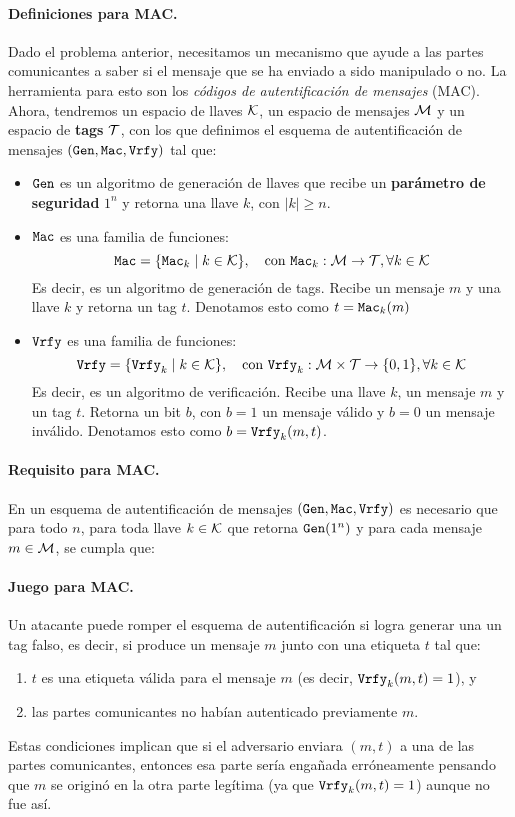 \paragraph{Definiciones para MAC.} Dado el problema anterior, necesitamos un mecanismo que ayude a las partes comunicantes a saber si el mensaje que se ha enviado a sido manipulado o no. La herramienta para esto son los \textit{códigos de autentificación de mensajes} (MAC). Ahora, tendremos un espacio de llaves $\mathcal{K}$, un espacio de mensajes $\mathcal{M}$ y un espacio de \textbf{tags} $\mathcal{T}$, con los que definimos el esquema de autentificación de mensajes $(\texttt{Gen}, \texttt{Mac}, \texttt{Vrfy})$ tal que:

\begin{itemize}
    \item $\texttt{Gen}$ es un algoritmo de generación de llaves que recibe un \textbf{parámetro de seguridad} $1^n$ y retorna una llave $k$, con $|k| \geq n$.
    \item $\texttt{Mac}$ es una familia de funciones:
    $$
    \texttt{Mac} = \{\texttt{Mac}_k \mid k \in \mathcal{K}\}, \quad \text{con } \texttt{Mac}_k:\mathcal{M} \to \mathcal{T}, \forall k \in \mathcal{K}
    $$
    Es decir, es un algoritmo de generación de tags. Recibe un mensaje $m$ y una llave $k$ y retorna un tag $t$. Denotamos esto como $t = \texttt{Mac}_k(m)$
    \item $\texttt{Vrfy}$ es una familia de funciones: 
    $$
    \texttt{Vrfy} = \{\texttt{Vrfy}_k \mid k \in \mathcal{K}\}, \quad \text{con } \texttt{Vrfy}_k:\mathcal{M} \times \mathcal{T} \to \{0,1\}, \forall k \in \mathcal{K}
    $$
    Es decir, es un algoritmo de verificación. Recibe una llave $k$, un mensaje $m$ y un tag $t$. Retorna un bit $b$, con $b = 1$ un mensaje válido y $b = 0$ un mensaje inválido. Denotamos esto como $b = \texttt{Vrfy}_k(m, t)$.
\end{itemize}

\paragraph*{Requisito para MAC.} En un esquema de autentificación de mensajes $(\texttt{Gen}, \texttt{Mac}, \texttt{Vrfy})$ es necesario que para todo $n$, para toda llave $k \in \mathcal{K}$ que retorna $\texttt{Gen}(1^n)$  y para cada mensaje $m \in \mathcal{M}$, se cumpla que:
\paragraph{Juego para MAC.} Un atacante puede romper el esquema de autentificación si logra generar una un tag falso, es decir, si produce un mensaje $m$ junto con una etiqueta $t$ tal que:
\begin{enumerate}
    \item $t$ es una etiqueta válida para el mensaje $m$ (es decir, $\texttt{Vrfy}_k(m,t) = 1$), y
    \item las partes comunicantes no habían autenticado previamente $m$.
\end{enumerate}
Estas condiciones implican que si el adversario enviara $(m,t)$ a una de las partes comunicantes, entonces esa parte sería engañada erróneamente pensando que $m$ se originó en la otra parte legítima (ya que $\texttt{Vrfy}_k (m, t) = 1$) aunque no fue así. \bigbreak

